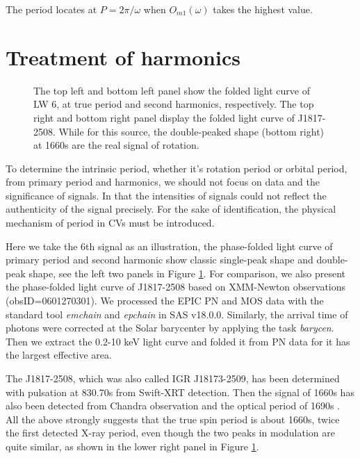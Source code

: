 \documentclass[twoside,twocolumn]{aastex63}
\begin{document}
The period locates at $P=2\pi /\omega $ when $O_{m1}(\omega)$ takes the highest value.


\section{Treatment of harmonics}\label{harmonics}

\begin{figure}[htbp]
\caption{The top left and bottom left panel show the folded light curve of LW 6, at true period and second harmonics, respectively. The top right and bottom right panel display the folded light curve of J1817-2508. While for this source, the double-peaked shape (bottom right) at 1660s are the real signal of rotation. \label{fig:6thfig}}
\end{figure}

To determine the intrinsic period, whether it's rotation period or orbital period, from primary period and harmonics, we should not focus on data and the significance of signals. In that the intensities of signals could not reflect the authenticity of the signal precisely. For the sake of  identification, the physical mechanism of period in CVs must be introduced. 

Here we take the 6th signal as an illustration, the phase-folded light curve of primary period and second harmonic show classic  single-peak shape and double-peak shape, see the left two panels in Figure \ref{fig:6thfig}. For comparison, we also present the phase-folded light curve of J1817-2508 based on XMM-Newton observations (obsID=0601270301).
We processed the EPIC PN and MOS data with the standard tool \emph{emchain} and \emph{epchain} in SAS v18.0.0. Similarly, the arrival time of photons were corrected at the Solar barycenter  by applying the task \emph{barycen}.
Then we extract the 0.2-10 keV light curve and folded it from PN data for it has the largest effective area.

 The J1817-2508, which was also called IGR J18173-2509, has been determined with pulsation at 830.70s from Swift-XRT detection. Then the signal of 1660s has also been detected from Chandra observation \citep{2009ATel.2354....1N} and the optical period of 1690s \citep{2012A&A...542A..22B}. All the above strongly suggests that the true spin period is about 1660s, twice the first detected X-ray period, even though the two peaks in modulation are quite similar, as shown in the lower right panel in Figure \ref{fig:6thfig}.
 
\end{document}
